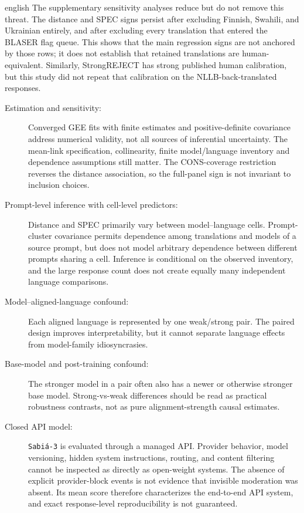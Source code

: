 \begin{otherlanguage*}{english}
The supplementary sensitivity analyses reduce but do not remove this threat. The
distance and SPEC signs persist after excluding Finnish, Swahili, and Ukrainian
entirely, and after excluding every translation that entered the BLASER flag
queue. This shows that the main regression signs are not anchored by those
rows; it does not establish that retained translations are human-equivalent.
Similarly, StrongREJECT has strong published human calibration, but this study
did not repeat that calibration on the NLLB-back-translated responses.

\begin{description}
    \item[Estimation and sensitivity:] Converged GEE fits with finite estimates and positive-definite covariance address numerical validity, not all sources of inferential uncertainty. The mean-link specification, collinearity, finite model/language inventory and dependence assumptions still matter. The CONS-coverage restriction reverses the distance association, so the full-panel sign is not invariant to inclusion choices.

    \item[Prompt-level inference with cell-level predictors:] Distance and SPEC primarily vary between model--language cells. Prompt-cluster covariance permits dependence among translations and models of a source prompt, but does not model arbitrary dependence between different prompts sharing a cell. Inference is conditional on the observed inventory, and the large response count does not create equally many independent language comparisons.

    \item[Model--aligned-language confound:] Each aligned language is represented by one weak/strong pair. The paired design improves interpretability, but it cannot separate language effects from model-family idiosyncrasies.

    \item[Base-model and post-training confound:] The stronger model in a pair often also has a newer or otherwise stronger base model. Strong-vs-weak differences should be read as practical robustness contrasts, not as pure alignment-strength causal estimates.

    \item[Closed API model:] \texttt{Sabiá-3} is evaluated through a managed API. Provider behavior, model versioning, hidden system instructions, routing, and content filtering cannot be inspected as directly as open-weight systems. The absence of explicit provider-block events is not evidence that invisible moderation was absent. Its mean score therefore characterizes the end-to-end API system, and exact response-level reproducibility is not guaranteed.


\end{description}
\end{otherlanguage*}

